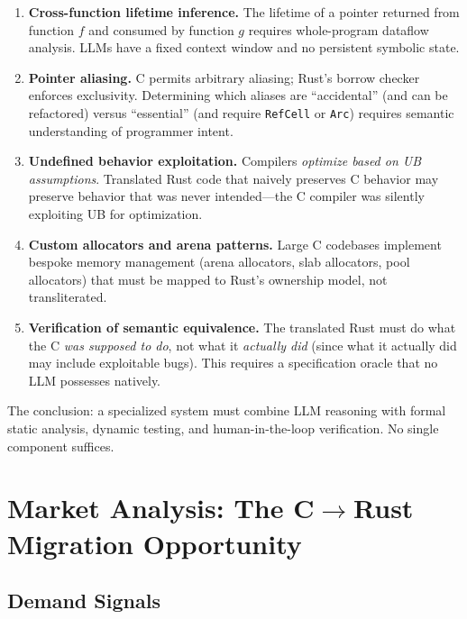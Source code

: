 \documentclass[11pt,a4paper]{article}
\theoremstyle{definition}
\theoremstyle{remark}
\begin{document}
\begin{enumerate}[leftmargin=2em]
\item \textbf{Cross-function lifetime inference.} The lifetime of a pointer returned from function $f$ and consumed by function $g$ requires whole-program dataflow analysis. LLMs have a fixed context window and no persistent symbolic state.

\item \textbf{Pointer aliasing.} C permits arbitrary aliasing; Rust's borrow checker enforces exclusivity. Determining which aliases are ``accidental'' (and can be refactored) versus ``essential'' (and require \texttt{RefCell} or \texttt{Arc}) requires semantic understanding of programmer intent.

\item \textbf{Undefined behavior exploitation.} Compilers \textit{optimize based on UB assumptions}. Translated Rust code that naively preserves C behavior may preserve behavior that was never intended---the C compiler was silently exploiting UB for optimization.

\item \textbf{Custom allocators and arena patterns.} Large C codebases implement bespoke memory management (arena allocators, slab allocators, pool allocators) that must be mapped to Rust's ownership model, not transliterated.

\item \textbf{Verification of semantic equivalence.} The translated Rust must do what the C \textit{was supposed to do}, not what it \textit{actually did} (since what it actually did may include exploitable bugs). This requires a specification oracle that no LLM possesses natively.
\end{enumerate}

The conclusion: a specialized system must combine LLM reasoning with formal static analysis, dynamic testing, and human-in-the-loop verification. No single component suffices.


\section{Market Analysis: The C$\to$Rust Migration Opportunity}

\subsection{Demand Signals}
\end{document}
